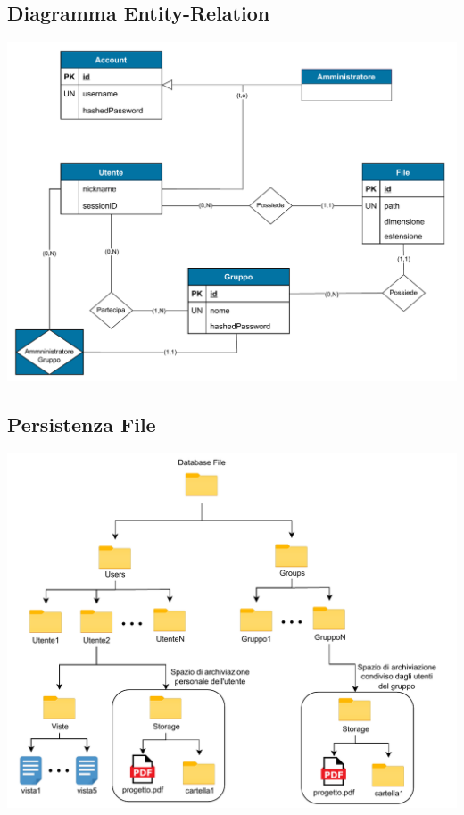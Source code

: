 \subsection*{Diagramma Entity-Relation}
{}
\vspace{0.5cm}
\begin{adjustwidth}{-2cm}{0cm}
\includegraphics[scale=0.9]{progettazione/Diagramma-Sequenza-Diagramma-ER.drawio.pdf}
\end{adjustwidth}
\vspace{0.5cm}


\vspace{1cm}
\subsection*{Persistenza File}
{}
\vspace{0.5cm}
\begin{adjustwidth}{-1cm}{0cm}
\includegraphics[scale=1]{deployment/Diagramma-Sequenza-File.drawio.pdf}
\end{adjustwidth}
\vspace{0.5cm}

